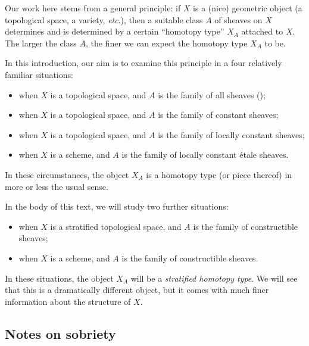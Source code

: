 
Our work here stems from a general principle: if $ X $ is a (nice) geometric object (a topological space, a variety, \emph{etc}.), then a suitable class $ A $ of sheaves on $ X $ determines and is determined by a certain \enquote{homotopy type} $ X_A $ attached to $ X $.
The larger the class $ A $, the finer we can expect the homotopy type $ X_A $ to be.

In this introduction, our aim is to examine this principle in a four relatively familiar situations:
\begin{itemize}
	\item when $ X $ is a topological space, and $ A $ is the family of all sheaves ();
	\item when $ X $ is a topological space, and $ A $ is the family of constant sheaves;
	\item when $ X $ is a topological space, and $ A $ is the family of locally constant sheaves;
	\item when $ X $ is a scheme, and $ A $ is the family of locally constant étale sheaves. 
\end{itemize}
In these circumstances, the object $ X_A $ is a homotopy type (or piece thereof) in more or less the usual sense.

In the body of this text, we will study two further situations:
\begin{itemize}
	\item when $ X $ is a stratified topological space, and $ A $ is the family of constructible sheaves;
	\item when $ X $ is a scheme, and $ A $ is the family of constructible sheaves.
\end{itemize}
In these situations, the object $ X_A $ will be a \emph{stratified homotopy type}.
We will see that this is a dramatically different object, but it comes with much finer information about the structure of $ X $.

\subsection{Notes on sobriety}%
\label{sub:notes_on_sobriety}

